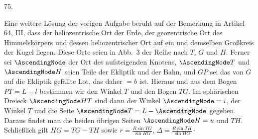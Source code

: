 \par{}\medskip
{}\hypertarget{native-099-article075}{}
\begin{center}75.\end{center}
Eine weitere Lösung der vorigen Aufgabe beruht auf der Bemerkung in Artikel 64, III, dass der heliozentrische Ort der Erde, der geozentrische Ort des Himmelskörpers und dessen heliozentrischer Ort auf ein und demselben Großkreis der Kugel liegen. Diese Orte seien in Abb.~3 der Reihe nach $T$, $G$ und $H$. Ferner sei $\AscendingNode$ der Ort des aufsteigenden Knotens, $\AscendingNode T$ und $\AscendingNode H$ seien Teile der Ekliptik und der Bahn, und $GP$ sei das von $G$ auf die Ekliptik gefällte Lot, das daher $=b$ ist. Hieraus und aus dem Bogen $PT=L-l$ bestimmen wir den Winkel $T$ und den Bogen $TG$. Im sphärischen Dreieck $\AscendingNode HT$ sind dann der Winkel $\AscendingNode=i$, der Winkel $T$ und die Seite $\AscendingNode T=L-\AscendingNode$ gegeben. Daraus findet man die beiden übrigen Seiten $\AscendingNode H=u$ und $TH$. Schließlich gilt $HG=TG-TH$ sowie $r=\frac{R\sin TG}{\sin HG}$, $\Delta=\frac{R\sin TH}{\sin HG}\mathpunct{\cdot}$
